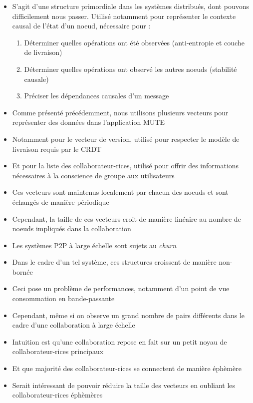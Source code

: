 \begin{itemize}
    \item S'agit d'une structure primordiale dans les systèmes distribués, dont pouvons difficilement nous passer.
      Utilisé notamment pour représenter le contexte causal de l'état d'un noeud, nécessaire pour :
      \begin{enumerate}
        \item Déterminer quelles opérations ont été observées (anti-entropie et couche de livraison)
        \item Déterminer quelles opérations ont observé les autres noeuds (stabilité causale)
        \item Préciser les dépendances causales d'un message
      \end{enumerate}
    \item Comme présenté précédemment, nous utilisons plusieurs vecteurs pour représenter des données dans l'application MUTE
    \item Notamment pour le vecteur de version, utilisé pour respecter le modèle de livraison requis par le \ac{CRDT}
    \item Et pour la liste des collaborateur-rices, utilisé pour offrir des informations nécessaires à la conscience de groupe aux utilisateurs
    \item Ces vecteurs sont maintenus localement par chacun des noeuds et sont échangés de manière périodique
    \item Cependant, la taille de ces vecteurs croit de manière linéaire au nombre de noeuds impliqués dans la collaboration
    \item Les systèmes \ac{P2P} à large échelle sont sujets au \emph{churn}
    \item Dans le cadre d'un tel système, ces structures croissent de manière non-bornée
    \item Ceci pose un problème de performances, notamment d'un point de vue consommation en bande-passante
    \item Cependant, même si on observe un grand nombre de pairs différents dans le cadre d'une collaboration à large échelle
    \item Intuition est qu'une collaboration repose en fait sur un petit noyau de collaborateur-rices principaux
    \item Et que majorité des collaborateur-rices se connectent de manière éphèmère
    \item Serait intéressant de pouvoir réduire la taille des vecteurs en oubliant les collaborateur-rices éphèmères

\end{itemize}
